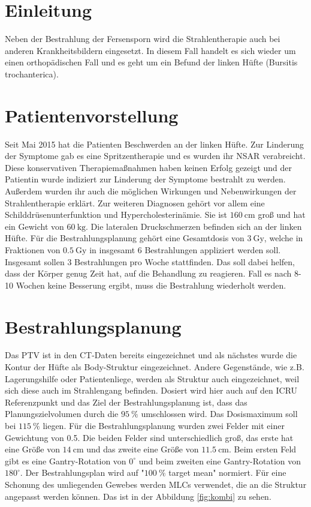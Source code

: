 \section{Einleitung}
\label{sec:Einleitung}

Neben der Bestrahlung der Fersensporn wird die Strahlentherapie auch bei anderen Krankheitsbildern eingesetzt. In diesem Fall handelt es sich wieder um einen orthopädischen Fall und es geht um ein Befund der linken Hüfte (Bursitis trochanterica). 

\section{Patientenvorstellung}
\label{sec:Vorstellung}

Seit Mai 2015 hat die Patienten Beschwerden an der linken Hüfte. Zur Linderung der Symptome gab es eine Spritzentherapie und es wurden ihr NSAR verabreicht. Diese konservativen Therapiemaßnahmen haben keinen Erfolg gezeigt und der Patientin wurde indiziert zur Linderung der Symptome bestrahlt zu werden. Außerdem wurden ihr auch die möglichen Wirkungen und Nebenwirkungen der Strahlentherapie erklärt. Zur weiteren Diagnosen gehört vor allem eine Schilddrüsenunterfunktion und Hypercholesterinämie. Sie ist $\SI{160}{\centi\meter}$ groß und hat ein Gewicht von $\SI{60}{\kilo\gram}$. Die lateralen Druckschmerzen befinden sich an der linken Hüfte. Für die Bestrahlungsplanung gehört eine Gesamtdosis von $\SI{3}{\gray}$, welche in Fraktionen von $\SI{0,5}{\gray}$ in insgesamt 6 Bestrahlungen appliziert werden soll. Insgesamt sollen 3 Bestrahlungen pro Woche stattfinden. Das soll dabei helfen, dass der Körper genug Zeit hat, auf die Behandlung zu reagieren. Fall es nach 8-10 Wochen keine Besserung ergibt, muss die Bestrahlung wiederholt werden.

\section{Bestrahlungsplanung}
\label{sec:bestrahlung}

Das PTV ist in den CT-Daten bereits eingezeichnet und als nächstes wurde die Kontur der Hüfte als Body-Struktur eingezeichnet. Andere Gegenstände, wie z.B. Lagerungshilfe oder Patientenliege, werden als Struktur auch eingezeichnet, weil sich diese auch im Strahlengang befinden. Dosiert wird hier auch auf den ICRU Referenzpunkt und das Ziel der Bestrahlungsplanung ist, dass das Planungszielvolumen durch die $\SI{95}{\percent}$ umschlossen wird. Das Dosismaximum soll bei $\SI{115}{\percent}$ liegen. Für die Bestrahlungsplanung wurden zwei Felder mit einer Gewichtung von 0.5. Die beiden Felder sind unterschiedlich groß, das erste hat eine Größe von  $\SI{14}{\centi\meter}$ und das zweite eine Größe von $\SI{11.5}{\centi\meter}$. Beim ersten Feld gibt es eine Gantry-Rotation von $0^\circ$ und beim zweiten eine Gantry-Rotation von $180^\circ$. Der Bestrahlungsplan wird auf "$\SI{100}{\percent}$ target mean" normiert. Für eine Schonung des umliegenden Gewebes werden MLCs verwendet, die an die Struktur angepasst werden können. Das ist in der Abbildung \ref{fig:kombi} zu sehen. 

